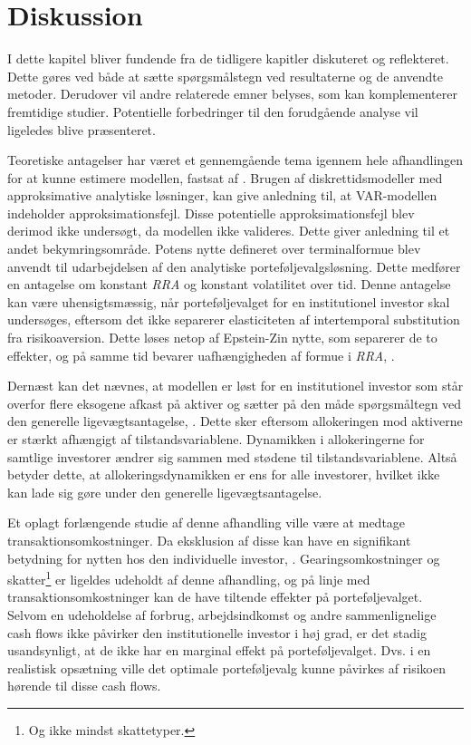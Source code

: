 \documentclass[
  a4paper,
  oneside]{memoir}
\begin{document}
\hypertarget{disku}{%
\chapter{Diskussion}\label{disku}}

I dette kapitel bliver fundende fra de tidligere kapitler diskuteret og reflekteret. Dette gøres ved både at sætte spørgsmålstegn ved resultaterne og de anvendte metoder. Derudover vil andre relaterede emner belyses, som kan komplementerer fremtidige studier. Potentielle forbedringer til den forudgående analyse vil ligeledes blive præsenteret.

Teoretiske antagelser har været et gennemgående tema igennem hele afhandlingen for at kunne estimere modellen, fastsat af \citep{JurVic2011}. Brugen af diskrettidsmodeller med approksimative analytiske løsninger, kan give anledning til, at VAR-modellen indeholder approksimationsfejl. Disse potentielle approksimationsfejl blev derimod ikke undersøgt, da modellen ikke valideres. Dette giver anledning til et andet bekymringsområde. Potens nytte defineret over terminalformue blev anvendt til udarbejdelsen af den analytiske porteføljevalgsløsning. Dette medfører en antagelse om konstant \emph{RRA} og konstant volatilitet over tid. Denne antagelse kan være uhensigtsmæssig, når porteføljevalget for en institutionel investor skal undersøges, eftersom det ikke separerer elasticiteten af intertemporal substitution fra risikoaversion. Dette løses netop af Epstein-Zin nytte, som separerer de to effekter, og på samme tid bevarer uafhængigheden af formue i \emph{RRA}, \citep{CampVicCha2003}.

Dernæst kan det nævnes, at modellen er løst for en institutionel investor som står overfor flere eksogene afkast på aktiver og sætter på den måde spørgsmåltegn ved den generelle ligevægtsantagelse, \citep{CampVic2001}. Dette sker eftersom allokeringen mod aktiverne er stærkt afhængigt af tilstandsvariablene. Dynamikken i allokeringerne for samtlige investorer ændrer sig sammen med stødene til tilstandsvariablene. Altså betyder dette, at allokeringsdynamikken er ens for alle investorer, hvilket ikke kan lade sig gøre under den generelle ligevægtsantagelse.

Et oplagt forlængende studie af denne afhandling ville være at medtage transaktionsomkostninger. Da eksklusion af disse kan have en signifikant betydning for nytten hos den individuelle investor, \citep{BalLyn1999}. Gearingsomkostninger og skatter\footnote{Og ikke mindst skattetyper.} er ligeldes udeholdt af denne afhandling, og på linje med transaktionsomkostninger kan de have tiltende effekter på porteføljevalget. Selvom en udeholdelse af forbrug, arbejdsindkomst og andre sammenlignelige cash flows ikke påvirker den institutionelle investor i høj grad, er det stadig usandsynligt, at de ikke har en marginal effekt på porteføljevalget. Dvs. i en realistisk opsætning ville det optimale porteføljevalg kunne påvirkes af risikoen hørende til disse cash flows.
\end{document}
